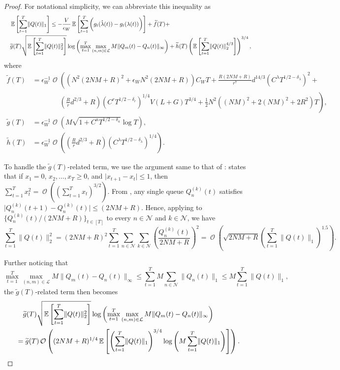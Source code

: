 \documentclass[11pt,fullpage,letterpaper]{article} %
\renewcommand{\bm}[1]{#1}%
\renewcommand{\tilde}{\widetilde}
\renewcommand{\O}{\operatorname{\mathcal O}}
\newcommand{\E}{\operatornamewithlimits{\mathbb{E}}}
\newcommand{\mN}{{\mathcal N}}
\newcommand{\mL}{{\mathcal L}}
\begin{document}
\begin{proof}
For notational simplicity, we can abbreviate this inequality as
\begin{align*}
&\quad \E\left [\sum_{t=1}^T \lVert \bm Q(t)\rVert_1\right ]\le -\frac{V}{\epsilon_W} \E\left [\sum_{t=1}^T \bigg (g_t(\mathring{\bm \lambda}(t)) - g_t(\bm \lambda(t))\bigg )\right ]+\tilde f(T)+\\
&\quad \tilde g(T) \sqrt{\E\left [\sum_{t=1}^T \lVert \bm Q(t)\rVert_2^2\right ]} \log \left (\max_{t=1}^T \max_{(n,m)\in \mL} M \lVert \bm Q_m(t)-\bm Q_n(t)\rVert_\infty\right ) + \tilde h(T) \left (\E\left [\sum_{t=1}^T \lVert \bm Q(t)\rVert_2^{4/3}\right ]\right )^{3/4},
\end{align*}
where
\begin{align*}
\tilde f(T)&= \epsilon_W^{-1} \O\left ((N^2 (2NM+R)^2 + \epsilon_W N^2 (2NM+R)) C_W T + \frac{R(2NM+R)}{r^7} d^{14/3} (C^\lambda T^{1/2 - \delta_\lambda})^2\right .+\\
&\qquad \qquad \left .\left (\frac{R}{r} d^{2/3}+R\right ) (C^r T^{1/2 - \delta_r})^{1/4} V(L+G) T^{3/4}+\frac 12 N^2 ((NM)^2+2(NM)^2+2R^2) T\right ),\\
\tilde g(T)&=\epsilon_W^{-1} \O\left (M \sqrt{1+C^a T^{1/2 - \delta_a}} \log T \right ), \\
\tilde h(T)&=\epsilon_W^{-1} \O\left (\left (\frac Rr d^{2/3} + R\right ) (C^\lambda T^{1/2 - \delta_\lambda})^{1/4}\right ).
\end{align*}

To handle the $\tilde g(T)$-related term, we use the argument same to that of :
 states that if $x_1=0$, $x_2,\ldots,x_T \ge 0$, and $\lvert x_{t+1}-x_t\rvert\le 1$, then $\sum_{t=1}^T x_t^2 = \O\left ((\sum_{t=1}^T x_t)^{3/2}\right )$. From , any single queue $Q_n^{(k)}(t)$ satisfies $\lvert Q_n^{(k)}(t+1)-Q_n^{(k)}(t)\rvert \le (2NM + R)$.
Hence, applying  to $\{Q_n^{(k)}(t) / (2NM+R)\}_{t\in [T]}$ to every $n\in \mN$ and $k\in \mN$, we have
\begin{equation*}
\sum_{t=1}^T \lVert \bm Q(t)\rVert_2^2 = (2NM+R)^2 \sum_{t=1}^T \sum_{n\in \mN} \sum_{k\in \mN} \left (\frac{Q_n^{(k)}(t)}{2NM+R}\right )^2 =\O\left (\sqrt{2NM+R} \left (\sum_{t=1}^T \lVert \bm Q(t)\rVert_1\right )^{1.5}\right ).
\end{equation*}

Further noticing that
\begin{equation*}
\max_{t=1}^T \max_{(n,m)\in \mL} M \lVert \bm Q_m(t) - \bm Q_n(t)\rVert_\infty\le \sum_{t=1}^T M \sum_{n\in \mN} \lVert \bm Q_n(t)\rVert_1\le M \sum_{t=1}^T \lVert \bm Q(t)\rVert_1,
\end{equation*}
the $\tilde g(T)$-related term then becomes
\begin{align*}
&\quad \tilde g(T) \sqrt{\E\left [\sum_{t=1}^T \lVert \bm Q(t)\rVert_2^2\right ]} \log \left (\max_{t=1}^T \max_{(n,m)\in \mL} M \lVert \bm Q_m(t)-\bm Q_n(t)\rVert_\infty\right )\\
&=\tilde g(T) \O\left ((2NM+R)^{1/4} \E\left [\left (\sum_{t=1}^T \lVert \bm Q(t)\rVert_1\right )^{3/4} \log \left (M \sum_{t=1}^T \lVert \bm Q(t)\rVert_1\right )\right ]\right ).
\end{align*}


\end{proof}
\end{document}
